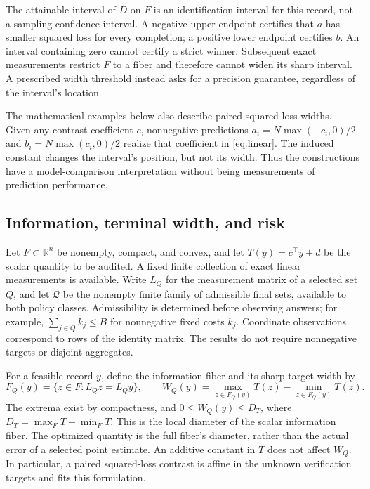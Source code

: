 \documentclass[12pt]{article}
\begin{document}
The attainable interval of $D$ on $F$ is an identification interval for
this record, not a sampling confidence interval. A negative upper endpoint
certifies that $a$ has smaller squared loss for every completion; a positive
lower endpoint certifies $b$. An interval containing zero cannot certify
a strict winner. Subsequent exact measurements restrict $F$ to a fiber and
therefore cannot widen its sharp interval. A prescribed width threshold
instead asks for a precision guarantee, regardless of the interval's location.

The mathematical examples below also describe paired squared-loss widths.
Given any contrast coefficient $c$, nonnegative predictions
$a_i=N\max(-c_i,0)/2$ and $b_i=N\max(c_i,0)/2$ realize that coefficient
in \eqref{eq:linear}. The induced constant changes the interval's position,
but not its width. Thus the constructions have a model-comparison
interpretation without being measurements of prediction performance.

\subsection{Information, terminal width, and risk}
\label{sec:risk_setup}
Let $F\subset\mathbb R^n$ be nonempty, compact, and convex, and let
$T(y)=c^\top y+d$ be the scalar quantity to be audited. A fixed finite
collection of exact linear measurements is available. Write $L_Q$ for
the measurement matrix of a selected set $Q$, and let $\mathcal Q$ be
the nonempty finite family of admissible final sets, available to both
policy classes. Admissibility is determined before observing answers; for example,
$\sum_{j\in Q}k_j\le B$ for nonnegative fixed costs $k_j$.
Coordinate observations correspond to rows of the identity matrix.
The results do not require nonnegative targets or disjoint aggregates.

For a feasible record $y$, define the information fiber and its sharp
target width by
\begin{equation}
 F_Q(y)=\{z\in F:L_Qz=L_Qy\},\qquad
 W_Q(y)=\max_{z\in F_Q(y)}T(z)-\min_{z\in F_Q(y)}T(z).
 \label{eq:risk_fiber}
\end{equation}
The extrema exist by compactness, and $0\le W_Q(y)\le D_T$, where
$D_T=\max_F T-\min_F T$. This is the local diameter of the
scalar information fiber. The optimized quantity is the full fiber's
diameter, rather than the actual error of a selected point estimate.
An additive constant in $T$ does
not affect $W_Q$. In particular, a paired squared-loss contrast is
affine in the unknown verification targets and fits this formulation.
\end{document}

